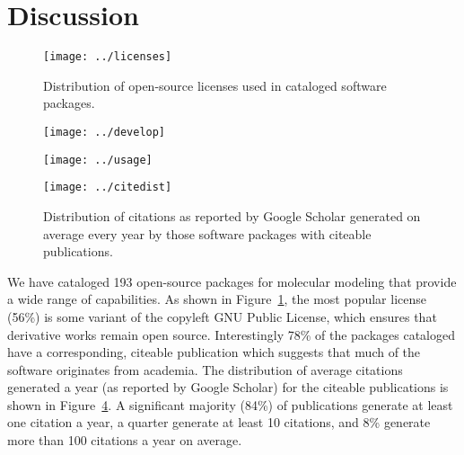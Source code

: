 \section{Discussion}

\begin{figure}
\centering 
\texttt{[image: ../licenses]}
\caption{\label{licenses} Distribution of open-source licenses used in cataloged software packages.}
\end{figure}

\begin{figure*}
\centering
\begin{subfigure}[t]{.4\linewidth}
\centering \label{develop}
\texttt{[image: ../develop]}
\end{subfigure}
\hfill
\begin{subfigure}[t]{.4\linewidth}
\centering \label{usage}
\texttt{[image: ../usage]}
\end{subfigure}
\caption{\label{pies} Activity distributions of cataloged software packages.
 Distribution of development activity.  Distribution of user activity.
}
\end{figure*}

\begin{figure}
\centering 
\texttt{[image: ../citedist]}
\caption{\label{cites} Distribution of citations as reported by Google Scholar generated on average every year by those software packages with citeable publications.}
\end{figure}


We have cataloged 193 open-source packages for molecular modeling that provide a wide range of capabilities.  As shown in Figure~\ref{licenses}, the most popular license (56\%) is some variant of the copyleft GNU Public License, which ensures that derivative works remain open source.  Interestingly 78\% of the packages cataloged have a corresponding, citeable publication which suggests that much of the software originates from academia.   The distribution of average citations generated a year (as reported by Google Scholar) for the citeable publications is shown in Figure~\ref{cites}.  A significant majority (84\%) of publications generate at least one citation a year, a quarter generate at least 10 citations, and 8\% generate more than 100 citations a year on average.

